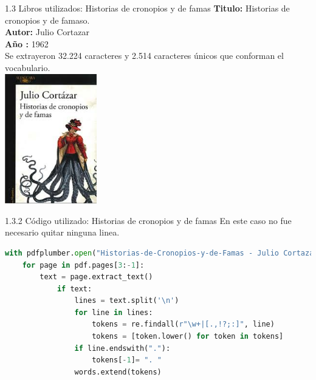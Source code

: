 \documentclass{beamer}
\begin{document}

\begin{frame}{1.3 Libros utilizados: Historias de cronopios y de famas}
	\justifying
	\textbf{Titulo:} Historias de cronopios y de famaso.\\
	\textbf{Autor:} Julio Cortazar\\
	\textbf{Año :} 1962\\
	Se extrayeron 32.224 caracteres y 2.514 caracteres únicos que conforman el vocabulario.\\
	\centering
	\vspace{0.2cm}
	\includegraphics[width=0.3\textwidth]{historias_de_cronopios_y_de_famas_cortazar}
	
\end{frame}

\begin{frame}[fragile]{1.3.2 Código utilizado: Historias de cronopios y de famas}
	\justifying
	En este caso no fue necesario quitar ninguna linea.
	\begin{lstlisting}[language=Python]
with pdfplumber.open("Historias-de-Cronopios-y-de-Famas - Julio Cortazar.pdf") as pdf:
	for page in pdf.pages[3:-1]:
		text = page.extract_text()
			if text:
				lines = text.split('\n')
				for line in lines:
					tokens = re.findall(r"\w+|[.,!?;:]", line)
					tokens = [token.lower() for token in tokens]
				if line.endswith("."):
					tokens[-1]= ". "
				words.extend(tokens)
	\end{lstlisting}
	
\end{frame}
	
	
\end{document}

